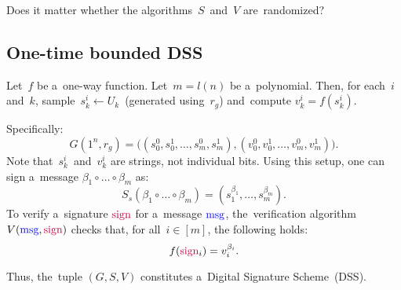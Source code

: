 \begin{exercise}
	Does it matter whether the algorithms~$S$~and~$V$ are~randomized?
\end{exercise}

%

\subsection{One-time bounded DSS}

\begin{theorem}
	Let~$f$ be a~one-way function.
	Let~$m = l(n)$ be a~polynomial.
	Then, for each~$i$ and~$k$, sample~$s_{k}^{i} \gets U_k$~(generated using~$r_g$) and~compute $v_k^{i} = f(s_{k}^{i})$.

	Specifically:
	\[
		G(1^{n}, r_g) = \big((s^{0}_{0}, s^{1}_{0}, \ldots, s^{0}_{m}, s^{1}_{m}), (v^{0}_{0}, v^{1}_{0}, \ldots, v^{0}_{m}, v^{1}_{m})\big).
	\] 
	Note that~$s_{k}^{i}$~and~$v_{k}^{i}$ are strings, not individual bits.
	Using this setup, one can sign a~message $\beta_1 \circ \ldots \circ \beta_m$ as:
	\[
		S_s(\beta_1 \circ \ldots \circ \beta_m) = (s_1^{\beta_1}, \ldots, s_m^{\beta_m}).
	\] 
	To verify a~signature $\textcolor{purple}{\text{sign}}$ for a~message $\textcolor{blue}{\text{msg}}$, the~verification algorithm~$V(\textcolor{blue}{\text{msg}}, \textcolor{purple}{\text{sign}})$ checks that, for all~$i \in [m]$, the following holds:
	\[
		f(\textcolor{purple}{\text{sign}}_i) = v_i^{\beta_i}.
	\]

	Thus, the~tuple $(G, S, V)$ constitutes a~Digital Signature Scheme~(DSS).
\end{theorem}

